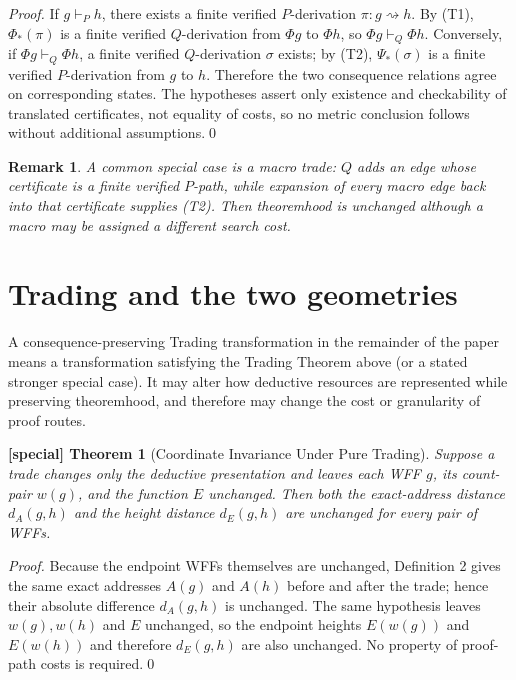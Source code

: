 \documentclass[11pt]{article}
\newtheorem{spthm}{[special] Theorem}
\newtheorem*{remark}{Remark}
\newcommand{\dA}{d_A}
\newcommand{\dE}{d_E}
\begin{document}
\textit{Proof.} If $g\vdash_P h$, there exists a finite verified $P$-derivation $\pi:g\rightsquigarrow h$. By (T1), $\Phi_*(\pi)$ is a finite verified $Q$-derivation from $\Phi g$ to $\Phi h$, so $\Phi g\vdash_Q\Phi h$. Conversely, if $\Phi g\vdash_Q\Phi h$, a finite verified $Q$-derivation $\sigma$ exists; by (T2), $\Psi_*(\sigma)$ is a finite verified $P$-derivation from $g$ to $h$. Therefore the two consequence relations agree on corresponding states. The hypotheses assert only existence and checkability of translated certificates, not equality of costs, so no metric conclusion follows without additional assumptions.\qed

\begin{remark}
A common special case is a macro trade: $Q$ adds an edge whose certificate is a finite verified $P$-path, while expansion of every macro edge back into that certificate supplies (T2). Then theoremhood is unchanged although a macro may be assigned a different search cost.
\end{remark}

\section{Trading and the two geometries}
A consequence-preserving Trading transformation in the remainder of the paper means a transformation satisfying the Trading Theorem above (or a stated stronger special case). It may alter how deductive resources are represented while preserving theoremhood, and therefore may change the cost or granularity of proof routes.

\begin{spthm}[Coordinate Invariance Under Pure Trading]
Suppose a trade changes only the deductive presentation and leaves each WFF $g$, its count-pair $w(g)$, and the function $E$ unchanged. Then both the exact-address distance $\dA(g,h)$ and the height distance $\dE(g,h)$ are unchanged for every pair of WFFs.
\end{spthm}
\textit{Proof.} Because the endpoint WFFs themselves are unchanged, Definition 2 gives the same exact addresses $A(g)$ and $A(h)$ before and after the trade; hence their absolute difference $d_A(g,h)$ is unchanged. The same hypothesis leaves $w(g),w(h)$ and $E$ unchanged, so the endpoint heights $E(w(g))$ and $E(w(h))$ and therefore $d_E(g,h)$ are also unchanged. No property of proof-path costs is required.\qed
\end{document}
